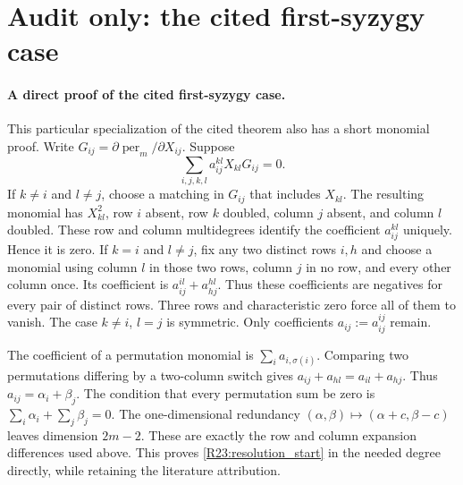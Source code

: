 \section*{Audit only: the cited first-syzygy case}
\paragraph{A direct proof of the cited first-syzygy case.}
This particular specialization of the cited theorem also has a short
monomial proof. Write
$G_{ij}=\partial\operatorname{per}_m/\partial X_{ij}$. Suppose
\[
 \sum_{i,j,k,l}a_{ij}^{kl}X_{kl}G_{ij}=0.
\]
If $k\ne i$ and $l\ne j$, choose a matching in $G_{ij}$ that includes
$X_{kl}$. The resulting monomial has $X_{kl}^2$, row $i$ absent,
row $k$ doubled, column $j$ absent, and column $l$ doubled.
These row and column multidegrees identify the coefficient
$a_{ij}^{kl}$ uniquely. Hence it is zero.
If $k=i$ and $l\ne j$, fix any two distinct rows $i,h$ and choose a
monomial using column $l$ in those two rows, column $j$ in no row,
and every other column once. Its coefficient is
$a_{ij}^{il}+a_{hj}^{hl}$. Thus these coefficients are negatives
for every pair of distinct rows. Three rows and characteristic zero
force all of them to vanish. The case $k\ne i$, $l=j$ is symmetric.
Only coefficients $a_{ij}:=a_{ij}^{ij}$ remain.

The coefficient of a permutation monomial is
$\sum_i a_{i,\sigma(i)}$. Comparing two permutations differing by a
two-column switch gives
$a_{ij}+a_{hl}=a_{il}+a_{hj}$. Thus
$a_{ij}=\alpha_i+\beta_j$. The condition that every permutation sum
be zero is $\sum_i\alpha_i+\sum_j\beta_j=0$. The one-dimensional
redundancy $(\alpha,\beta)\mapsto(\alpha+c,\beta-c)$ leaves dimension
$2m-2$. These are exactly the row and column expansion differences
used above. This proves \eqref{R23:resolution_start} in the needed
degree directly, while retaining the literature attribution.


